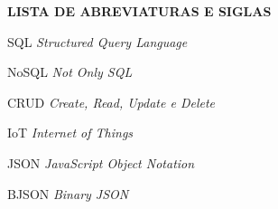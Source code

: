 \vfill
\begin{center}
{\textbf{LISTA DE ABREVIATURAS E SIGLAS}}
\end{center}
\vspace{0.5cm}

\begin{siglas}
\item[SQL] \textit{Structured Query Language}
\item[NoSQL] \textit{Not Only SQL}
\item[CRUD] \textit{Create, Read, Update e Delete}
\item[IoT] \textit{Internet of Things}
\item[JSON] \textit{JavaScript Object Notation}
\item[BJSON] \textit{Binary JSON}
\end{siglas}
